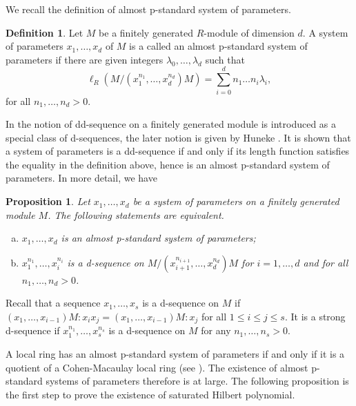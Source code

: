 \documentclass{amsart}
\newtheorem{proposition}[theorem]{Proposition}
\theoremstyle {definition}
\newtheorem {definition}[theorem]{Definition}
\theoremstyle {remark}
\begin{document}
We recall the definition of almost p-standard system of parameters.

\begin{definition}\cite[Definition 2.1]{DTCNam}\label{31}
Let $M$ be a finitely generated $R$-module of dimension $d$. A system of parameters $x_1, \ldots, x_d$ of $M$ is a called an almost p-standard system of parameters if there are given integers $\lambda_0, \ldots, \lambda_d$ such that
$$\ell_R(M/(x_1^{n_1}, \ldots, x_d^{n_d})M)=\sum_{i=0}^dn_1\ldots n_i\lambda_i,$$
for all $n_1, \ldots, n_d>0$.
\end{definition}

In \cite{NTCDTC1} the notion of dd-sequence on a finitely generated module is introduced as a special class of d-sequences, the later notion is given by Huneke \cite{HU}. It is shown that a system of parameters is a dd-sequence if and only if its length function satisfies the equality in the definition above, hence is an almost p-standard system of parameters. In more detail, we have

\begin{proposition}\cite[Corollary 3.6]{NTCDTC1}\label{32}
Let $x_1, \ldots, x_d$ be a system of parameters on a finitely generated module $M$. The following statements are equivalent.
\begin{enumerate}[(a)]
\item $x_1, \ldots, x_d$ is an almost p-standard system of parameters;
\item $x_1^{n_1}, \ldots, x_i^{n_i}$ is a d-sequence on $M/(x_{i+1}^{n_{i+1}}, \ldots, x_d^{n_d})M$ for $i=1, \ldots, d$ and for all $n_1, \ldots, n_d>0$.
\end{enumerate}
\end{proposition}

Recall that a sequence $x_1, \ldots, x_s$ is a d-sequence on $M$ if $(x_1, \ldots, x_{i-1})M:x_ix_j=(x_1, \ldots, x_{i-1})M:x_j$ for all $1\leq i\leq j\leq s$. It is a strong d-sequence if $x_1^{n_1}, \ldots, x_s^{n_s}$ is a d-sequence on $M$ for any $n_1, \ldots, n_s>0$.

A local ring has an almost p-standard system of parameters if and only if it is a quotient of a Cohen-Macaulay local ring (see \cite{NTCDTC2}). The existence of almost p-standard systems of parameters therefore is at large. The following proposition is the first step to prove the existence of saturated Hilbert polynomial.
\end{document}
